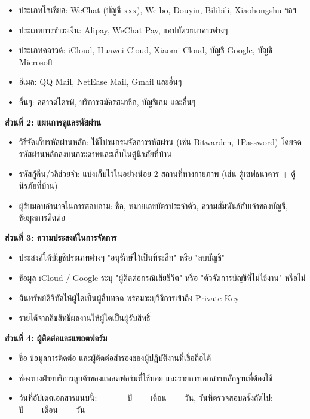 \begin{itemize}
  \item ประเภทโซเชียล: WeChat (บัญชี xxx), Weibo, Douyin, Bilibili, Xiaohongshu ฯลฯ
  \item ประเภทการชำระเงิน: Alipay, WeChat Pay, แอปบัตรธนาคารต่างๆ
  \item ประเภทคลาวด์: iCloud, Huawei Cloud, Xiaomi Cloud, บัญชี Google, บัญชี Microsoft
  \item อีเมล: QQ Mail, NetEase Mail, Gmail และอื่นๆ
  \item อื่นๆ: คลาวด์ไดรฟ์, บริการสมัครสมาชิก, บัญชีเกม และอื่นๆ
\end{itemize}

\textbf{ส่วนที่ 2: แผนการดูแลรหัสผ่าน}

\begin{itemize}
  \item วิธีจัดเก็บรหัสผ่านหลัก: ใช้โปรแกรมจัดการรหัสผ่าน (เช่น Bitwarden, 1Password) โดยจดรหัสผ่านหลักลงบนกระดาษและเก็บในตู้นิรภัยที่บ้าน
  \item รหัสกู้คืน/วลีช่วยจำ: แบ่งเก็บไว้ในอย่างน้อย 2 สถานที่ทางกายภาพ (เช่น ตู้เซฟธนาคาร + ตู้นิรภัยที่บ้าน)
  \item ผู้รับมอบอำนาจในการสอบถาม: ชื่อ, หมายเลขบัตรประจำตัว, ความสัมพันธ์กับเจ้าของบัญชี, ข้อมูลการติดต่อ
\end{itemize}

\textbf{ส่วนที่ 3: ความประสงค์ในการจัดการ}

\begin{itemize}
  \item ประสงค์ให้บัญชีประเภทต่างๆ "อนุรักษ์ไว้เป็นที่ระลึก" หรือ "ลบบัญชี"
  \item ข้อมูล iCloud / Google ระบุ "ผู้ติดต่อกรณีเสียชีวิต" หรือ "ตัวจัดการบัญชีที่ไม่ใช้งาน" หรือไม่
  \item สินทรัพย์ดิจิทัลให้ผู้ใดเป็นผู้สืบทอด พร้อมระบุวิธีการเข้าถึง Private Key
  \item รายได้จากลิขสิทธิ์ผลงานให้ผู้ใดเป็นผู้รับสิทธิ์
\end{itemize}

\textbf{ส่วนที่ 4: ผู้ติดต่อและแพลตฟอร์ม}

\begin{itemize}
  \item ชื่อ ข้อมูลการติดต่อ และผู้ติดต่อสำรองของผู้ปฏิบัติงานที่เชื่อถือได้
  \item ช่องทางฝ่ายบริการลูกค้าของแพลตฟอร์มที่ใช้บ่อย และรายการเอกสารหลักฐานที่ต้องใช้
  \item วันที่อัปเดตเอกสารแนบนี้: \_\_\_\_ ปี \_\_ เดือน \_\_ วัน, วันที่ตรวจสอบครั้งถัดไป: \_\_\_\_ ปี \_\_ เดือน \_\_ วัน
\end{itemize}

